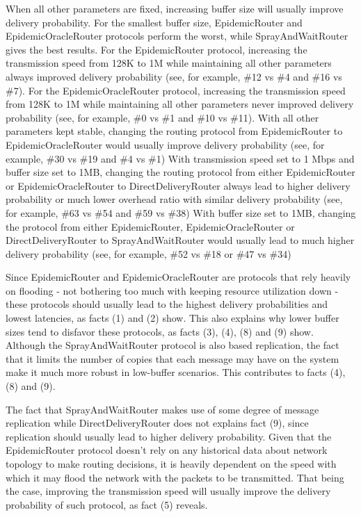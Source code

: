 When all other parameters are fixed, increasing buffer size will usually improve delivery probability.
For the smallest buffer size, EpidemicRouter and EpidemicOracleRouter protocols
perform the worst, while SprayAndWaitRouter gives the best results.
For the EpidemicRouter protocol, increasing the transmission speed from 128K to
1M while maintaining all other parameters always improved delivery probability
(see, for example, \#12 vs \#4 and \#16 vs \#7).
For the EpidemicOracleRouter protocol, increasing the transmission speed from
128K to 1M while maintaining all other parameters never improved delivery
probability (see, for example, \#0 vs \#1 and \#10 vs \#11).
With all other parameters kept stable, changing the routing protocol from
EpidemicRouter to EpidemicOracleRouter would usually improve delivery
probability (see, for example, \#30 vs \#19 and \#4 vs \#1)
With transmission speed set to 1 Mbps and buffer size set to 1MB, changing the
routing protocol from either EpidemicRouter or EpidemicOracleRouter to
DirectDeliveryRouter always lead to higher delivery probability or much lower
overhead ratio with similar delivery probability (see, for example, \#63 vs
\#54 and \#59 vs \#38)
With buffer size set to 1MB, changing the protocol from either
EpidemicRouter, EpidemicOracleRouter or DirectDeliveryRouter to
SprayAndWaitRouter would usually lead to much higher delivery probability (see,
for example, \#52 vs \#18 or \#47 vs \#34)

Since EpidemicRouter and EpidemicOracleRouter are protocols that rely heavily
on flooding - not bothering too much with keeping resource utilization down -
these protocols should usually lead to the highest delivery probabilities and
lowest latencies, as facts (1) and (2) show. This also explains why lower
buffer sizes tend to disfavor these protocols, as facts (3), (4), (8) and (9)
show.
Although the SprayAndWaitRouter protocol is also based replication, the fact
that it limits the number of copies that each message may have on the system
make it much more robust in low-buffer scenarios. This contributes to facts
(4), (8) and (9).

The fact that SprayAndWaitRouter makes use of some degree of message
replication while DirectDeliveryRouter does not explains fact (9), since
replication should usually lead to higher delivery probability.
Given that the EpidemicRouter protocol doesn't rely on any historical data
about network topology to make routing decisions, it is heavily dependent on
the speed with which it may flood the network with the packets to be
transmitted. That being the case, improving the transmission speed will usually
improve the delivery probability of such protocol, as fact (5) reveals.

